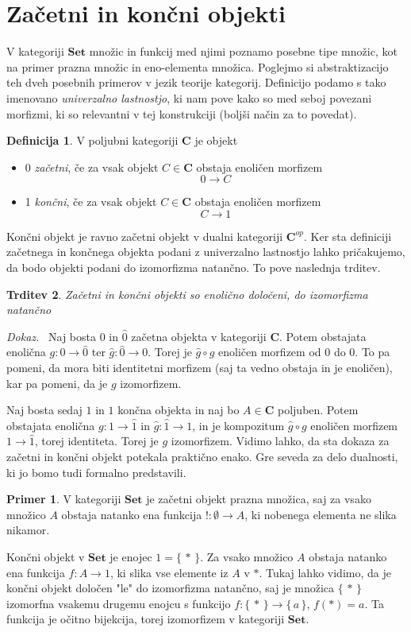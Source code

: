 \documentclass[12pt,a4paper]{book}
\theoremstyle{definition}
\newtheorem{definicija}{Definicija}[chapter]
\theoremstyle{plain}
\newtheorem{trditev}[definicija]{Trditev}
\newenvironment{dokaz}{\emph{Dokaz.}\ }{\hspace{\fill}{$\Box$}}
\theoremstyle{definition}
\newtheorem{primer}{Primer}[section]
\theoremstyle{remark}
\newcommand{\cat}[1]{\textbf{#1}}
\renewcommand{\set}[1]{\{\,#1\,\}}
\begin{document}
\section{Začetni in končni objekti}
V kategoriji $\cat{Set}$ množic in funkcij med njimi poznamo posebne tipe množic, kot na primer prazna množic in eno-elementa množica. Poglejmo si abstraktizacijo teh dveh posebnih primerov v jezik teorije kategorij. Definicijo podamo s tako imenovano \textit{univerzalno lastnostjo}, ki nam pove kako so med seboj povezani morfizmi, ki so relevantni v tej konstrukciji (boljši način za to povedat).

\begin{definicija}
V poljubni kategoriji $\cat{C}$ je objekt
\begin{itemize}
\item 0 \emph{začetni}, če za vsak objekt $C \in \cat{C}$ obstaja enoličen morfizem $$0 \to C$$
\item 1 \emph{končni}, če za vsak objekt $C \in \cat{C}$ obstaja enoličen morfizem $$C \to 1$$
\end{itemize}
\end{definicija}
Končni objekt je ravno začetni objekt v dualni kategoriji $\cat{C}^{op}$. Ker sta definiciji začetnega in končnega objekta podani z univerzalno lastnostjo lahko pričakujemo, da bodo objekti podani do izomorfizma natančno. To pove naslednja trditev.

\begin{trditev}
Začetni in končni objekti so enolično določeni, do izomorfizma natančno
\end{trditev}
\begin{dokaz}
Naj bosta $0$ in $\hat{0}$ začetna objekta v kategoriji $\cat{C}$. Potem obstajata enolična $g : 0 \to \hat{0}$ ter $\hat{g} : \hat{0} \to 0$. Torej je $\hat{g} \circ g$ enoličen morfizem od 0 do 0. To pa pomeni, da mora biti identitetni morfizem (saj ta vedno obstaja in je enoličen), kar pa pomeni, da je $g$ izomorfizem.

Naj bosta sedaj $1$ in $\hat{1}$ končna objekta in naj bo $A \in \cat{C}$ poljuben. Potem obstajata enolična $g : 1 \to \hat{1}$ in $\hat{g} : \hat{1} \to 1$, in je kompozitum $\hat{g} \circ g$ enoličen morfizem $1 \to \hat{1}$, torej identiteta. Torej je $g$ izomorfizem.
\end{dokaz}
Vidimo lahko, da sta dokaza za začetni in končni objekt potekala praktično enako. Gre seveda za delo dualnosti, ki jo bomo tudi formalno predstavili.

\begin{primer}
V kategoriji $\cat{Set}$ je začetni objekt prazna množica, saj za vsako množico $A$ obstaja natanko ena funkcija $! : \emptyset \to A$, ki nobenega elementa ne slika nikamor. 

Končni objekt v $\cat{Set}$ je enojec $1 = \set{*}$. Za vsako množico $A$ obstaja natanko ena funkcija $f : A \to 1$, ki slika vse elemente iz $A$ v $*$. Tukaj lahko vidimo, da je končni objekt določen "le" do izomorfizma natančno, saj je množica $\set{*}$ izomorfna vsakemu drugemu enojcu s funkcijo $f : \set{*} \to \set{a}$, $f(*) = a$. Ta funkcija je očitno bijekcija, torej izomorfizem v kategoriji $\cat{Set}$.
\end{primer}
\end{document}
